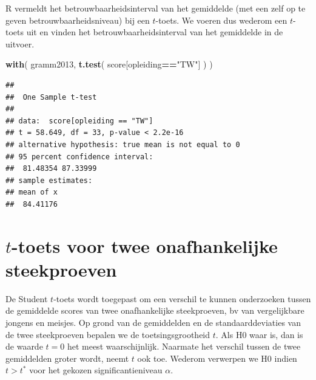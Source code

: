 \documentclass[
]{book}
\newenvironment{Shaded}{\begin{snugshade}}{\end{snugshade}}
\newcommand{\FunctionTok}[1]{\textcolor[rgb]{0.13,0.29,0.53}{\textbf{#1}}}
\newcommand{\NormalTok}[1]{#1}
\newcommand{\SpecialCharTok}[1]{\textcolor[rgb]{0.81,0.36,0.00}{\textbf{#1}}}
\newcommand{\StringTok}[1]{\textcolor[rgb]{0.31,0.60,0.02}{#1}}
\begin{document}
R vermeldt het betrouwbaarheidsinterval van het gemiddelde (met een zelf
op te geven betrouwbaarheidsniveau) bij een \(t\)-toets. We voeren dus
wederom een \(t\)-toets uit en vinden het betrouwbaarheidsinterval van het
gemiddelde in de uitvoer.

\begin{Shaded}
\begin{Highlighting}[]
\FunctionTok{with}\NormalTok{( gramm2013, }\FunctionTok{t.test}\NormalTok{( score[opleiding}\SpecialCharTok{==}\StringTok{"TW"}\NormalTok{] ) )}
\end{Highlighting}
\end{Shaded}

\begin{verbatim}
## 
##  One Sample t-test
## 
## data:  score[opleiding == "TW"]
## t = 58.649, df = 33, p-value < 2.2e-16
## alternative hypothesis: true mean is not equal to 0
## 95 percent confidence interval:
##  81.48354 87.33999
## sample estimates:
## mean of x 
##  84.41176
\end{verbatim}

\section{\texorpdfstring{\(t\)-toets voor twee onafhankelijke steekproeven}{t-toets voor twee onafhankelijke steekproeven}}\label{sec:ttoets-onafh}

De Student \(t\)-toets wordt toegepast om een verschil te kunnen
onderzoeken tussen de gemiddelde scores van twee onafhankelijke
steekproeven, bv van vergelijkbare jongens en meisjes. Op grond van de
gemiddelden en de standaarddeviaties van de twee steekproeven bepalen we
de toetsingsgrootheid \(t\). Als H0 waar is, dan is de waarde \(t=0\) het
meest waarschijnlijk. Naarmate het verschil tussen de twee gemiddelden
groter wordt, neemt \(t\) ook toe. Wederom verwerpen we H0 indien \(t>t^*\)
voor het gekozen significantieniveau \(\alpha\).
\end{document}
